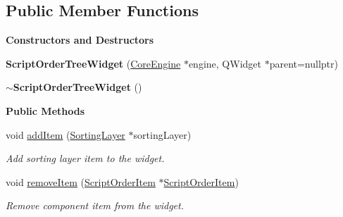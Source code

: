\subsection*{Public Member Functions}
\begin{Indent}\textbf{ Constructors and Destructors}\par
\begin{DoxyCompactItemize}
\item 
\mbox{\label{classrev_1_1_view_1_1_script_order_tree_widget_a6a76e5342076ca6a2e6f80ab8718ec29}} 
{\bfseries Script\+Order\+Tree\+Widget} (\mbox{\hyperlink{classrev_1_1_core_engine}{Core\+Engine}} $\ast$engine, Q\+Widget $\ast$parent=nullptr)
\item 
\mbox{\label{classrev_1_1_view_1_1_script_order_tree_widget_ab29122d541914a5afa27c60a31627560}} 
{\bfseries $\sim$\+Script\+Order\+Tree\+Widget} ()
\end{DoxyCompactItemize}
\end{Indent}
\begin{Indent}\textbf{ Public Methods}\par
\begin{DoxyCompactItemize}
\item 
\mbox{\label{classrev_1_1_view_1_1_script_order_tree_widget_aa00b144f254365e80a1be03fc28ec1b4}} 
void \mbox{\hyperlink{classrev_1_1_view_1_1_script_order_tree_widget_aa00b144f254365e80a1be03fc28ec1b4}{add\+Item}} (\mbox{\hyperlink{structrev_1_1_sorting_layer}{Sorting\+Layer}} $\ast$sorting\+Layer)
\begin{DoxyCompactList}\small\item\em Add sorting layer item to the widget. \end{DoxyCompactList}\item 
\mbox{\label{classrev_1_1_view_1_1_script_order_tree_widget_afeaafce1e595ef06e1771e3d9b09b492}} 
void \mbox{\hyperlink{classrev_1_1_view_1_1_script_order_tree_widget_afeaafce1e595ef06e1771e3d9b09b492}{remove\+Item}} (\mbox{\hyperlink{classrev_1_1_view_1_1_script_order_item}{Script\+Order\+Item}} $\ast$\mbox{\hyperlink{classrev_1_1_view_1_1_script_order_item}{Script\+Order\+Item}})
\begin{DoxyCompactList}\small\item\em Remove component item from the widget. \end{DoxyCompactList}\end{DoxyCompactItemize}
\end{Indent}
